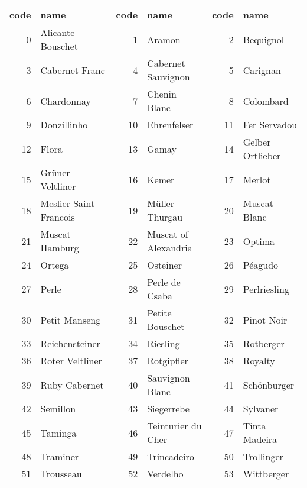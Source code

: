 
\footnotesize
\begin{tabular}{rl|rl|rl} \hline
code & name & code & name & code & name \\\hline
0 & Alicante Bouschet & 1 & Aramon & 2 & Bequignol \\
3 & Cabernet Franc & 4 & Cabernet Sauvignon & 5 & Carignan \\
6 & Chardonnay & 7 & Chenin Blanc & 8 & Colombard \\
9 & Donzillinho & 10 & Ehrenfelser & 11 & Fer Servadou \\
12 & Flora & 13 & Gamay & 14 & Gelber Ortlieber \\
15 & Gr\"uner Veltliner & 16 & Kemer & 17 & Merlot \\
18 & Meslier-Saint-Francois & 19 & M\"uller-Thurgau & 20 & Muscat Blanc \\
21 & Muscat Hamburg & 22 & Muscat of Alexandria & 23 & Optima \\
24 & Ortega & 25 & Osteiner & 26 & P\'eagudo \\
27 & Perle & 28 & Perle de Csaba & 29 & Perlriesling \\
30 & Petit Manseng & 31 & Petite Bouschet & 32 & Pinot Noir \\
33 & Reichensteiner & 34 & Riesling & 35 & Rotberger \\
36 & Roter Veltliner & 37 & Rotgipfler & 38 & Royalty \\
39 & Ruby Cabernet & 40 & Sauvignon Blanc & 41 & Sch\"onburger \\
42 & Semillon & 43 & Siegerrebe & 44 & Sylvaner \\
45 & Taminga & 46 & Teinturier du Cher & 47 & Tinta Madeira \\
48 & Traminer & 49 & Trincadeiro & 50 & Trollinger \\
51 & Trousseau & 52 & Verdelho & 53 & Wittberger \\\hline
\end{tabular}
